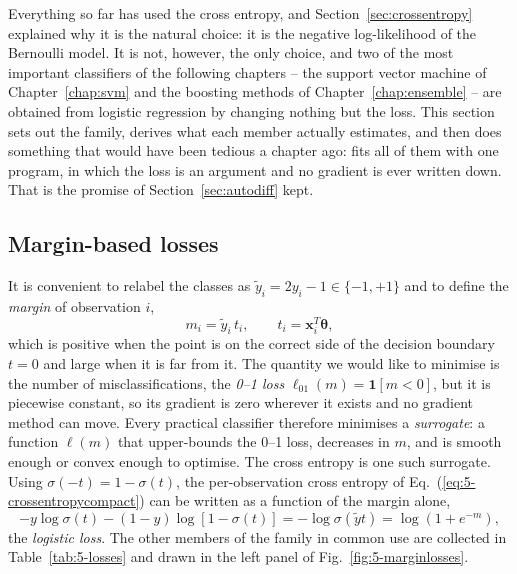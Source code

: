 Everything so far has used the cross entropy, and Section~\ref{sec:crossentropy}
explained why it is the natural choice: it is the negative log-likelihood of
the Bernoulli model.  It is not, however, the only choice, and two of the most
important classifiers of the following chapters -- the support vector machine
of Chapter~\ref{chap:svm} and the boosting methods of
Chapter~\ref{chap:ensemble} -- are obtained from logistic regression by
changing nothing but the loss.  This section sets out the family, derives
what each member actually estimates, and then does something that would have
been tedious a chapter ago: fits all of them with one program, in which the
loss is an argument and no gradient is ever written down.  That is the
promise of Section~\ref{sec:autodiff} kept.

\subsection{Margin-based losses}
\label{sec:marginlosses}

It is convenient to relabel the classes as $\tilde y_i=2y_i-1\in\{-1,+1\}$ and
to define the \emph{margin} of observation $i$,
\begin{equation}
  m_i = \tilde y_i\,t_i,
  \qquad t_i=\bm{x}_i^{T}\bm{\theta},
  \label{eq:5-margin}
\end{equation}
which is positive when the point is on the correct side of the decision
boundary $t=0$ and large when it is far from it.  The quantity we would like
to minimise is the number of misclassifications, the \emph{0--1 loss}
$\ell_{01}(m)=\mathbf{1}[m<0]$, but it is piecewise constant, so its
gradient is zero wherever it exists and no gradient method can move.  Every
practical classifier therefore minimises a \emph{surrogate}: a function
$\ell(m)$ that upper-bounds the 0--1 loss, decreases in $m$, and is smooth
enough or convex enough to optimise.  The cross entropy is one such surrogate.
Using $\sigma(-t)=1-\sigma(t)$, the per-observation cross entropy of
Eq.~(\ref{eq:5-crossentropycompact}) can be written as a function of the
margin alone,
\begin{equation}
  -y\log\sigma(t)-(1-y)\log[1-\sigma(t)]
   = -\log\sigma(\tilde y t) = \log\left(1+e^{-m}\right),
  \label{eq:5-logisticloss}
\end{equation}
the \emph{logistic loss}.  The other members of the family in common use are
collected in Table~\ref{tab:5-losses} and drawn in the left panel of
Fig.~\ref{fig:5-marginlosses}.

